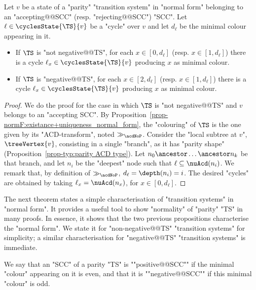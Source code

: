 \documentclass{theoretics}
\begin{document}
\begin{proposition}\label{prop-normF:flowers-in-normal_form}
	Let $v$ be a state of a "parity" "transition system" in "normal form" belonging to an "accepting@@SCC" (resp. "rejecting@@SCC") "SCC". Let  $\ell\in \cyclesState{\TS}{v}$ be a "cycle" over $v$ and let $d_\ell$ be the minimal colour appearing in it. 
	\begin{itemize}
		\item If $\TS$ is "not negative@@TS", for each $x\in [0, d_\ell]$ (resp. $x\in [1, d_\ell]$) there is a cycle $\ell_x \in \cyclesState{\TS}{v}$ producing $x$ as minimal colour.
		\item If $\TS$ is "negative@@TS", for each $x\in [2, d_\ell]$ (resp. $x\in [1, d_\ell]$) there is a cycle $\ell_x \in \cyclesState{\TS}{v}$ producing $x$ as minimal colour.
	\end{itemize}
	
\end{proposition}
\begin{proof}
	We do the proof for the case in which $\TS$ is "not negative@@TS" and $v$ belongs to an "accepting SCC".
	By Proposition~\ref{prop-normF:existance+uniqueness_normal_form}, the "colouring" of $\TS$ is the one given by its "ACD-transform", noted $\gg_{\acdNoP}$. Consider the "local subtree at $v$", $\treeVertex{v}$, consisting in a single "branch", as it has "parity shape" (Proposition~\ref{prop-typ:parity ACD type}). Let $n_0\ancestor\dots \ancestor n_k$ be that branch, and let $n_i$ be the "deepest" node such that $\ell\subseteq \nuAcd(n_i)$. We remark that, by definition of $\gg_{\acdNoP}$, $d_\ell = \depth(n_i) = i$. The desired "cycles" are obtained by taking $\ell_x = \nuAcd(n_x)$, for $x\in [0, d_\ell]$.
\end{proof}

The next theorem states a simple characterisation of "transition systems" in "normal form". It provides a useful tool to show "normality" of "parity" "TS" in many proofs. In essence, it shows that the two previous propositions characterise the "normal form". We state it for "non-negative@@TS" "transition systems" for simplicity; a similar characterisation for "negative@@TS" "transition systems" is immediate.

\AP We say that an "SCC" of a parity "TS" is ""positive@@SCC"" if the minimal "colour" appearing on it is even, and that it is ""negative@@SCC"" if this minimal "colour" is odd. 
\end{document}
